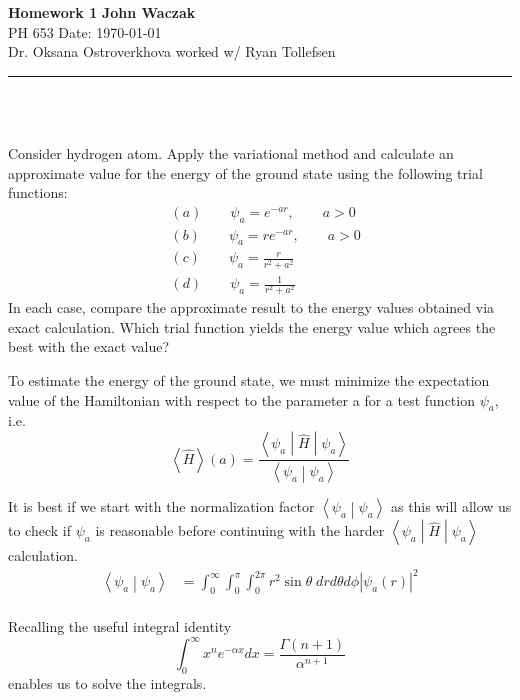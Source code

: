 \documentclass[a4paper, 11pt]{article}
\newcommand{\bracket}[2]{\ensuremath{\left\langle #1 \middle| #2 \right\rangle}}
\newcommand{\matrixel}[3]{\ensuremath{\left\langle #1 \middle| #2 \middle| #3 \right\rangle}}
\newcommand{\expectation}[1]{\ensuremath{\left\langle #1 \right\rangle}}
\newenvironment{solution}{%
	\begin{list}{}{%
			\setlength{\topsep}{0pt}%
			\setlength{\leftmargin}{0.5cm}%
			\setlength{\rightmargin}{0.5cm}%
			\setlength{\listparindent}{\parindent}%
			\setlength{\itemindent}{\parindent}%
			\setlength{\parsep}{\parskip}%
		}%
		\item[]}{\end{list}}
\begin{document}
\noindent
\large\textbf{Homework 1} \hfill \textbf{John Waczak} \\
\normalsize PH 653 \hfill  Date: \today \\
Dr. Oksana Ostroverkhova \hfill worked w/ Ryan Tollefsen
\par\noindent\rule{\textwidth}{0.4pt} \\\\



\begin{enumerate}[leftmargin=0em, label=\textbf{\arabic*}]
  \item Consider hydrogen atom. Apply the variational method and calculate an
approximate value for the energy of the ground state using the following trial
functions:
  \begin{align*}
    &(a)\qquad \psi_a = e^{-ar}, \qquad a>0\\
    &(b)\qquad \psi_a = re^{-ar}, \qquad a>0\\
    &(c)\qquad \psi_a = \frac{r}{r^2+a^2} \\
    &(d)\qquad \psi_a = \frac{1}{r^2+a^2}
  \end{align*}
  In each case, compare the approximate result to the energy values obtained via exact
calculation. Which trial function yields the energy value which agrees the best with the
exact value?

  \begin{solution}
      To estimate the energy of the ground state, we must minimize the
      expectation value of the Hamiltonian with respect to the parameter a for
      a test function $\psi_a$, i.e.
      \begin{equation}
        \expectation{\hat{H}}(a) = \frac{\matrixel{\psi_a}{\hat{H}}{\psi_a}}{\bracket{\psi_a}{\psi_a}}
      \end{equation}

      It is best if we start with the normalization factor
      $\bracket{\psi_a}{\psi_a}$ as this will allow us to check if $\psi_a$ is
      reasonable before continuing with the harder
      $\matrixel{\psi_a}{\hat{H}}{\psi_a}$ calculation.
      \begin{align}
        \bracket{\psi_a}{\psi_a} &= \int_0^\infty\int_0^\pi\int_0^{2\pi}r^2\sin\theta\;drd\theta d\phi \left| \psi_a(r) \right|^2\\
      \end{align}

      Recalling the useful integral identity
      \begin{equation}
        \int_0^\infty x^n e^{-\alpha x}dx = \frac{\Gamma(n+1)}{\alpha^{n+1}}
      \end{equation}
      enables us to solve the integrals.\\
      

\end{solution}
\end{enumerate}
\end{document}
